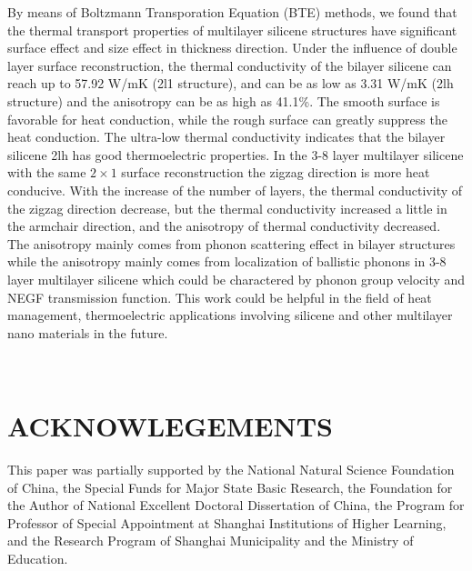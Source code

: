 \documentclass[%
 reprint,
 amsmath,amssymb,
 aps,
 prb,
]{revtex4-1}
\begin{document}
By means of Boltzmann Transporation Equation (BTE) methods, we found that the thermal transport properties of multilayer silicene structures have significant surface effect and size effect in thickness direction. Under the influence of double layer surface reconstruction, the thermal conductivity of the bilayer silicene can reach up to 57.92 W/mK (2l1 structure), and can be as low as 3.31 W/mK (2lh structure) and the anisotropy can be as high as 41.1\%. The smooth surface is favorable for heat conduction, while the rough surface can greatly suppress the heat conduction. The ultra-low thermal conductivity indicates that the bilayer silicene 2lh has good thermoelectric properties. In the 3-8 layer multilayer silicene with the same $2 \times 1$ surface reconstruction the zigzag direction is more heat conducive. With the increase of the number of layers, the thermal conductivity of the zigzag direction decrease, but the thermal conductivity increased a little in the armchair direction, and the anisotropy of thermal conductivity decreased. The anisotropy mainly comes from phonon scattering effect in bilayer structures while the anisotropy mainly comes from localization of ballistic phonons in 3-8 layer multilayer silicene which could be charactered by phonon group velocity and NEGF transmission function. This work could be helpful in the field of heat management, thermoelectric applications involving silicene and other multilayer nano materials in the future.

\quad \\
\section{ACKNOWLEGEMENTS}
This paper was partially supported by the National Natural Science Foundation of China, the Special Funds for Major State Basic Research, the Foundation for the Author of National Excellent Doctoral Dissertation of China, the Program for Professor of Special Appointment at Shanghai Institutions of Higher Learning, and the Research Program of Shanghai Municipality and the Ministry of Education.



\end{document}
